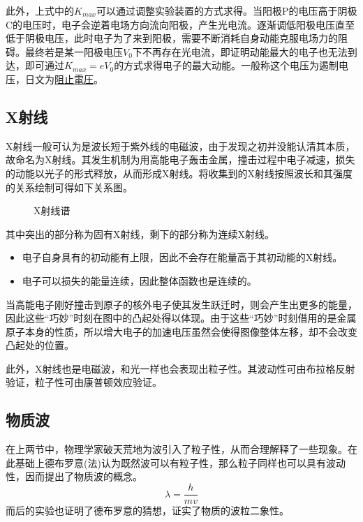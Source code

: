 此外，上式中的$K_{max}$可以通过调整实验装置的方式求得。当阳极P的电压高于阴极C的电压时，电子会逆着电场方向流向阳极，产生光电流。逐渐调低阳极电压直至低于阴极电压，此时电子为了来到阳极，需要不断消耗自身动能克服电场力的阻碍。最终若是某一阳极电压$V_0$下不再存在光电流，即证明动能最大的电子也无法到达，即可通过$K_{max}=eV_0$的方式求得电子的最大动能。一般称这个电压为遏制电压，日文为\underline{阻止電圧}。

\subsection{X射线}

X射线一般可认为是波长短于紫外线的电磁波，由于发现之初并没能认清其本质，故命名为X射线。其发生机制为用高能电子轰击金属，撞击过程中电子减速，损失的动能以光子的形式释放，从而形成X射线。将收集到的X射线按照波长和其强度的关系绘制可得如下关系图。
\begin{figure}[ht!]
    \centering
    \caption{X射线谱}
\end{figure}
其中突出的部分称为固有X射线，剩下的部分称为连续X射线。
\begin{itemize}
    \item 电子自身具有的初动能有上限，因此不会存在能量高于其初动能的X射线。
    \item 电子可以损失的能量连续，因此整体函数也是连续的。
\end{itemize}
当高能电子刚好撞击到原子的核外电子使其发生跃迁时，则会产生出更多的能量，因此这些“巧妙”时刻在图中的凸起处得以体现。由于这些“巧妙”时刻借用的是金属原子本身的性质，所以增大电子的加速电压虽然会使得图像整体左移，却不会改变凸起处的位置。

此外，X射线也是电磁波，和光一样也会表现出粒子性。其波动性可由布拉格反射验证，粒子性可由康普顿效应验证。

\subsection{物质波}

在上两节中，物理学家破天荒地为波引入了粒子性，从而合理解释了一些现象。在此基础上德布罗意(法)认为既然波可以有粒子性，那么粒子同样也可以具有波动性，因而提出了物质波的概念。
\begin{equation*}
    \lambda=\frac{h}{mv}
\end{equation*}
而后的实验也证明了德布罗意的猜想，证实了物质的波粒二象性。

